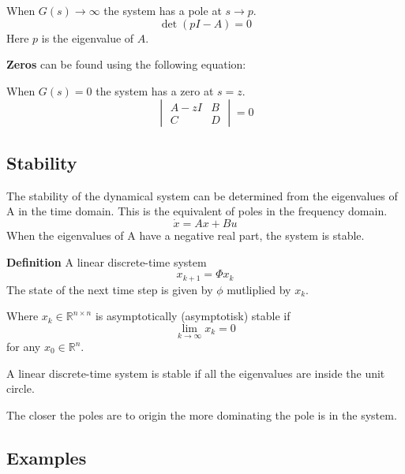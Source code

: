 When $G(s)\to \infty$ the system has a pole at $s\to p$.
$$\det(pI-A) = 0$$
Here $p$ is the eigenvalue of $A$.

\textbf{Zeros} can be found using the following equation:

When $G(s)=0$ the system has a zero at $s=z$.
$$\begin{vmatrix}
		A-zI & B \\
		C    & D
	\end{vmatrix} = 0$$




\subsection{Stability}
The stability of the dynamical system can be determined from the eigenvalues of A in the time domain.
This is the equivalent of poles in the frequency domain.
$$\dot{x} = Ax+Bu$$
When the eigenvalues of A have a negative real part, the system is stable.

\textbf{Definition}
A linear discrete-time system
$$x_{k+1}=\Phi x_k$$
The state of the next time step is given by $\phi$ mutliplied by $x_k$.

Where $x_k \in \mathbb{R}^{n \times n}$ is asymptotically (asymptotisk) stable if
$$\lim_{k \to \infty} x_k = 0$$
for any $x_0 \in \mathbb{R}^n$.

A linear discrete-time system is stable if all the eigenvalues are inside the unit circle.


The closer the poles are to origin the more dominating the pole is in the system.


\subsection{Examples}
